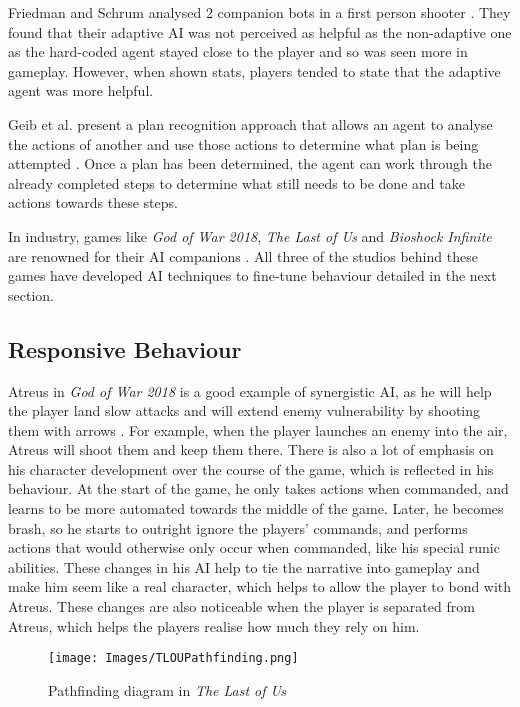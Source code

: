 \documentclass{IEEEtran}
\begin{document}
Friedman and Schrum analysed 2 companion bots in a first person shooter \cite{CompanionBotsFPS2019}. They found that their adaptive AI was not perceived as helpful as the non-adaptive one as the hard-coded agent stayed close to the player and so was seen more in gameplay. However, when shown stats, players tended to state that the adaptive agent was more helpful.

Geib et al. present a plan recognition approach that allows an agent to analyse the actions of another and use those actions to determine what plan is being attempted \cite{GeneratingCollabBehaviourPlanRecognition2016}. Once a plan has been determined, the agent can work through the already completed steps to determine what still needs to be done and take actions towards these steps.


In industry, games like \textit{God of War 2018}, \textit{The Last of Us} and \textit{Bioshock Infinite} are renowned for their AI companions \cite{PlayDontShow}. All three of the studios behind these games have developed AI techniques to fine-tune behaviour detailed in the next section.

\subsection{Responsive Behaviour}
\label{Responsive Behaviour}

Atreus in \textit{God of War 2018} is a good example of synergistic AI, as he will help the player land slow attacks and will extend enemy vulnerability by shooting them with arrows \cite{GDCAtreus}. For example, when the player launches an enemy into the air, Atreus will shoot them and keep them there. There is also a lot of emphasis on his character development over the course of the game, which is reflected in his behaviour. At the start of the game, he only takes actions when commanded, and learns to be more automated towards the middle of the game. Later, he becomes brash, so he starts to outright ignore the players’ commands, and performs actions that would otherwise only occur when commanded, like his special runic abilities. These changes in his AI help to tie the narrative into gameplay and make him seem like a real character, which helps to allow the player to bond with Atreus. These changes are also noticeable when the player is separated from Atreus, which helps the players realise how much they rely on him.

\begin{figure}
  \centering
  \texttt{[image: Images/TLOUPathfinding.png]}
  
\caption{Pathfinding diagram in \textit{The Last of Us}}
\label{fig:TLOUPathfinding}
\end{figure}
\end{document}
